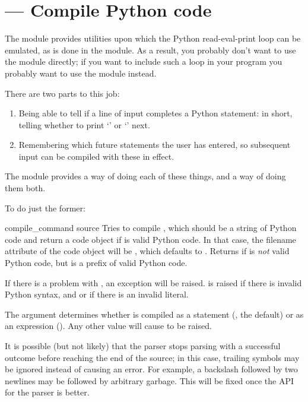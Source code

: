 \section{ ---
         Compile Python code}



The  module provides utilities upon which the Python
read-eval-print loop can be emulated, as is done in the
 module.  As a result, you probably don't want to use
the module directly; if you want to include such a loop in your
program you probably want to use the  module instead.

There are two parts to this job: 

\begin{enumerate}
  \item Being able to tell if a line of input completes a Python 
        statement: in short, telling whether to print
        `\code{>>>~}' or `' next.
  \item Remembering which future statements the user has entered, so 
        subsequent input can be compiled with these in effect.
\end{enumerate}

The  module provides a way of doing each of these
things, and a way of doing them both.

To do just the former:

\begin{funcdesc}{compile_command}
                {source}
Tries to compile , which should be a string of Python
code and return a code object if  is valid
Python code. In that case, the filename attribute of the code object
will be , which defaults to .
Returns  if  is \emph{not} valid Python
code, but is a prefix of valid Python code.

If there is a problem with , an exception will be raised.
 is raised if there is invalid Python syntax,
and  or  if there is an
invalid literal.

The  argument determines whether  is compiled
as a statement (, the default) or as an expression
().  Any other value will cause  to 
be raised.

It is possible (but not likely) that the parser stops parsing
with a successful outcome before reaching the end of the source;
in this case, trailing symbols may be ignored instead of causing an
error.  For example, a backslash followed by two newlines may be
followed by arbitrary garbage.  This will be fixed once the API
for the parser is better.
\end{funcdesc}

